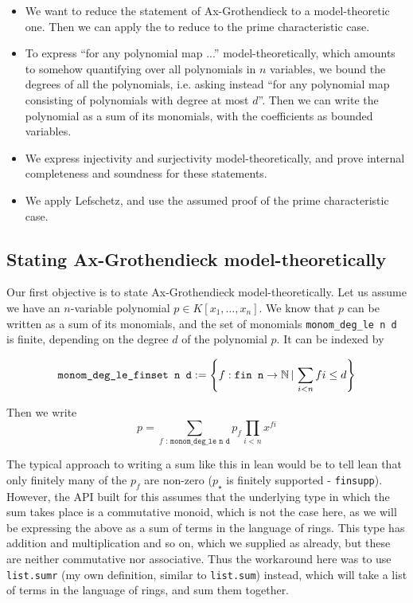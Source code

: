 \begin{itemize}
  \item We want to reduce the statement of Ax-Grothendieck to a model-theoretic one.
        Then we can apply the  to
        reduce to the prime characteristic case.
  \item To express ``for any polynomial map ...'' model-theoretically,
        which amounts to somehow quantifying over all polynomials
        in $n$ variables,
        we bound the degrees of all the polynomials,
        i.e. asking instead ``for any polynomial map consisting of
        polynomials with degree at most $d$''.
        Then we can write the polynomial as a sum of its monomials,
        with the coefficients as bounded variables.
  \item We express injectivity and surjectivity model-theoretically,
        and prove internal completeness and soundness for these statements.
  \item We apply Lefschetz, and use the assumed proof of the
        prime characteristic case.
\end{itemize}

\subsection{Stating Ax-Grothendieck model-theoretically}

Our first objective is to state Ax-Grothendieck model-theoretically.
Let us assume we have an $n$-variable polynomial $p \in K[x_{1},\dots,x_{n}]$.
We know that $p$ can be written as a sum of its monomials,
and the set of monomials \texttt{monom\_deg\_le n d} is finite,
depending on the degree $d$ of the polynomial $p$.
It can be indexed by

\[ \texttt{monom\_deg\_le\_finset n d} := \left\{ f : \texttt{fin n} \to \mathbb{N} \,|\, \sum_{i < n} f i \le d \right\}\]

Then we write
\[ p = \sum_{f\texttt{ : monom\_deg\_le n d}} p_{f}\prod_{i < n} x^{f i}\]

The typical approach to writing a sum like this in lean would be
to tell lean that only finitely many of the $p_{f}$ are non-zero
($p_{\star}$ is finitely supported - \texttt{finsupp}).
However, the API built for this assumes that the underlying
type in which the sum takes place is a commutative monoid,
which is not the case here,
as we will be expressing the above as a sum of terms
in the language of rings.
This type has addition and multiplication and so on,
which we supplied as  already,
but these are neither commutative nor associative.
Thus the workaround here was to use \texttt{list.sumr}
(my own definition, similar to \texttt{list.sum}) instead,
which will take a list of terms in the language of rings, and sum them together.

